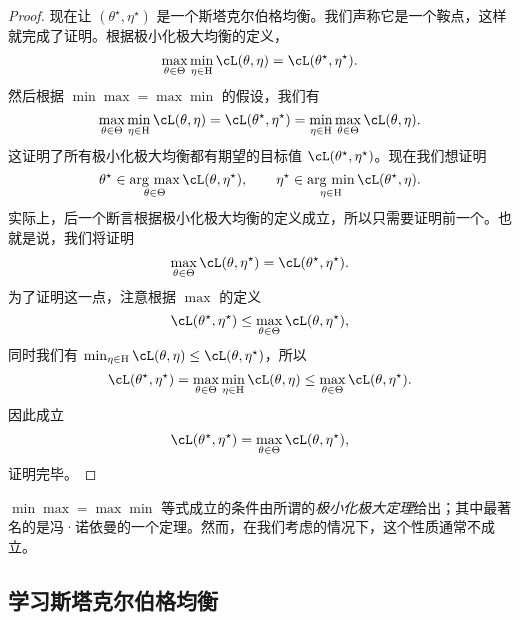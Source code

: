\documentclass[../../book-main_zh.tex]{subfiles}
\begin{document}
\begin{proof}
    现在让 \((\theta^{\star}, \eta^{\star})\) 是一个斯塔克尔伯格均衡。我们声称它是一个鞍点，这样就完成了证明。根据极小化极大均衡的定义，
    \begin{equation}
        \max_{\theta \in \Theta}\min_{\eta \in \Eta}\cL(\theta, \eta) = \cL(\theta^{\star}, \eta^{\star}).
    \end{equation}
    然后根据 \(\min\max = \max\min\) 的假设，我们有
    \begin{equation}
        \max_{\theta \in \Theta}\min_{\eta \in \Eta}\cL(\theta, \eta) = \cL(\theta^{\star}, \eta^{\star}) = \min_{\eta \in \Eta}\max_{\theta \in \Theta}\cL(\theta, \eta).
    \end{equation}
    这证明了所有极小化极大均衡都有期望的目标值 \(\cL(\theta^{\star}, \eta^{\star})\)。现在我们想证明
    \begin{equation}
        \theta^{\star} \in \argmax_{\theta \in \Theta}\cL(\theta, \eta^{\star}), \qquad \eta^{\star} \in \argmin_{\eta \in \Eta}\cL(\theta^{\star}, \eta).
    \end{equation}
    实际上，后一个断言根据极小化极大均衡的定义成立，所以只需要证明前一个。也就是说，我们将证明
    \begin{equation}
        \max_{\theta \in \Theta}\cL(\theta, \eta^{\star}) = \cL(\theta^{\star}, \eta^{\star}).
    \end{equation}
    为了证明这一点，注意根据 \(\max\) 的定义
    \begin{equation}
        \cL(\theta^{\star}, \eta^{\star}) \leq \max_{\theta \in \Theta}\cL(\theta, \eta^{\star}),
    \end{equation}
    同时我们有 \(\min_{\eta \in \Eta}\cL(\theta, \eta) \leq \cL(\theta, \eta^{\star})\)，所以
    \begin{equation}
        \cL(\theta^{\star}, \eta^{\star}) = \max_{\theta \in \Theta}\min_{\eta \in \Eta}\cL(\theta, \eta) \leq \max_{\theta \in \Theta}\cL(\theta, \eta^{\star}).
    \end{equation}
    因此成立
    \begin{equation}
        \cL(\theta^{\star}, \eta^{\star}) = \max_{\theta \in \Theta}\cL(\theta, \eta^{\star}),
    \end{equation}
    证明完毕。
\end{proof}
\(\min\max = \max\min\) 等式成立的条件由所谓的\textit{极小化极大定理}给出；其中最著名的是冯·诺依曼的一个定理。然而，在我们考虑的情况下，这个性质通常不成立。

\subsection{学习斯塔克尔伯格均衡}
\end{document}
